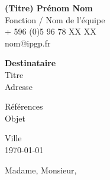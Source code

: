 \documentclass{lettreIPGP}
\begin{document}

\putlogo

{\bfseries (Titre) Prénom Nom}\\
Fonction / Nom de l’équipe\\
\myaddr
{\color{darkgray}
+ 596 (0)5 96 78 XX XX   %
\\
nom@ipgp.fr
}

\hspace*{\fill}\begin{minipage}{5cm}
{\bfseries Destinataire}\\
Titre\\
Adresse
\end{minipage}

Références\\
Objet

\begin{flushright}
Ville\\
\today
\end{flushright}

Madame, Monsieur,

\vspace*{3mm}

\lipsum[1-10]

\vspace{1.6cm}

\end{document}
